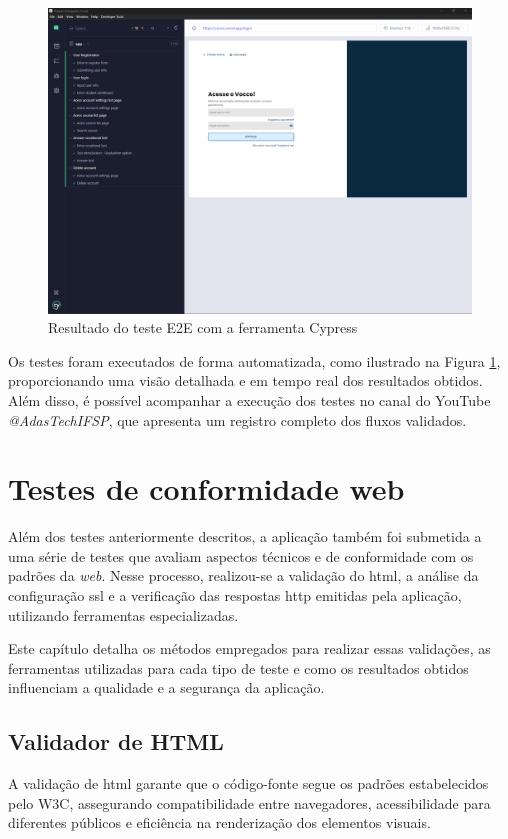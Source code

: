 \begin{figure}[ht]
        \centering
\includegraphics[width=1.0\textwidth]{images/e2e.png}
        \caption{Resultado do teste E2E com a ferramenta Cypress}
        \label{fig:e2e}
\end{figure}

Os testes foram executados de forma automatizada, como ilustrado na Figura \ref{fig:e2e}, proporcionando uma visão detalhada e em tempo real dos resultados obtidos. Além disso, é possível acompanhar a execução dos testes no canal do YouTube \textit{@AdasTechIFSP}, que apresenta um registro completo dos fluxos validados.  


\section{Testes de conformidade web}
Além dos testes anteriormente descritos, a aplicação também foi submetida a uma série de testes que avaliam aspectos técnicos e de conformidade com os padrões da \textit{web}. Nesse processo, realizou-se a validação do \ac{html}, a análise da configuração \ac{ssl} e a verificação das respostas \ac{http} emitidas pela aplicação, utilizando ferramentas especializadas.

Este capítulo detalha os métodos empregados para realizar essas validações, as ferramentas utilizadas para cada tipo de teste e como os resultados obtidos influenciam a qualidade e a segurança da aplicação.

\subsection{Validador de HTML}
A validação de \ac{html}  garante que o código-fonte segue os padrões estabelecidos pelo W3C, assegurando compatibilidade entre navegadores, acessibilidade para diferentes públicos e eficiência na renderização dos elementos visuais.

